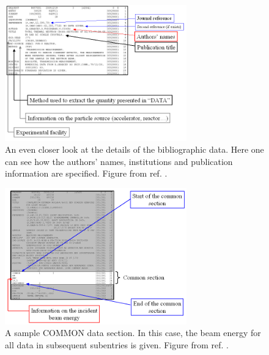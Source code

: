 \documentclass[11pt]{article}
\begin{document}
\begin{figure}[htbp]
\begin{center}
\includegraphics[width=0.7\textwidth]{figs/bib02.png}
\caption{\label{fig:3}An even closer look at the details of the bibliographic data.  Here one can see how the authors' names, institutions and publication information are specified.  Figure from ref. \cite{web}.}
\end{center}
\end{figure}

\begin{figure}[htbp]
\begin{center}
\includegraphics[width=0.7\textwidth]{figs/bib03.png}
\caption{\label{fig:4}A sample COMMON data section.  In this case, the beam energy for all data in subsequent subentries is given.  Figure from ref. \cite{web}.}
\end{center}
\end{figure}
\end{document}
